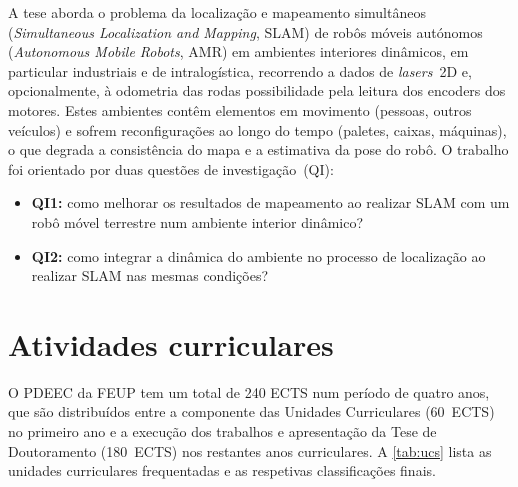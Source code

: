 \documentclass[11pt,a4paper,oneside]{article}
\begin{document}
A tese aborda o problema da localização e mapeamento simultâneos
(\textit{Simultaneous Localization and Mapping}, SLAM) de robôs móveis autónomos
(\textit{Autonomous Mobile Robots}, AMR) em ambientes interiores dinâmicos,
em particular industriais e de intralogística, recorrendo a dados de
\textit{lasers}~2D e, opcionalmente, à odometria das rodas possibilidade pela
leitura dos encoders dos motores.
Estes ambientes contêm elementos em movimento (pessoas, outros veículos) e sofrem
reconfigurações ao longo do tempo (paletes, caixas, máquinas), o que degrada a
consistência do mapa e a estimativa da pose do robô.
O trabalho foi orientado por duas questões de investigação~(QI):
\begin{itemize}
\item \textbf{QI1:} como melhorar os resultados de mapeamento ao realizar SLAM
      com um robô móvel terrestre num ambiente interior dinâmico?
\item \textbf{QI2:} como integrar a dinâmica do ambiente no processo de
      localização ao realizar SLAM nas mesmas condições?
\end{itemize}

\section{Atividades curriculares}\label{sec:curricular}

O PDEEC da FEUP tem um total de 240 ECTS num período de quatro anos, que são
distribuídos entre a componente das Unidades Curriculares (60~ECTS) no primeiro
ano e a execução dos trabalhos e apresentação da Tese de Doutoramento (180~ECTS)
nos restantes anos curriculares. A \autoref{tab:ucs} lista as unidades
curriculares frequentadas e as respetivas classificações finais.
\end{document}
